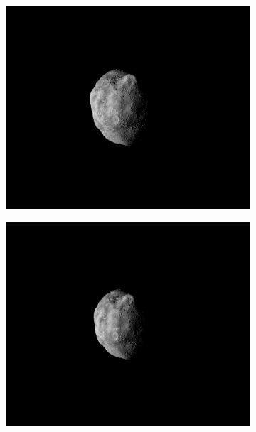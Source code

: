 \begin{figure}[htb]
\begin{subfigure}[b]{0.48\textwidth}
            \caption{}
            \label{fig:composition_before_2}
    \end{subfigure}
    \\
    \begin{subfigure}[b]{0.48\textwidth}
        \centering
            \includegraphics[width=\textwidth]{doc/thesis/0_figures/rendering_lighting/Inst_2017-08-15T115858-281000.png}
            \caption{}
            \label{fig:composition_after_1}
    \end{subfigure}
    \begin{subfigure}[b]{0.48\textwidth}
        \centering
            \includegraphics[width=\textwidth]{doc/thesis/0_figures/rendering_lighting/Inst_2017-08-15T115859-288000.png}

\end{subfigure}
\end{figure}
